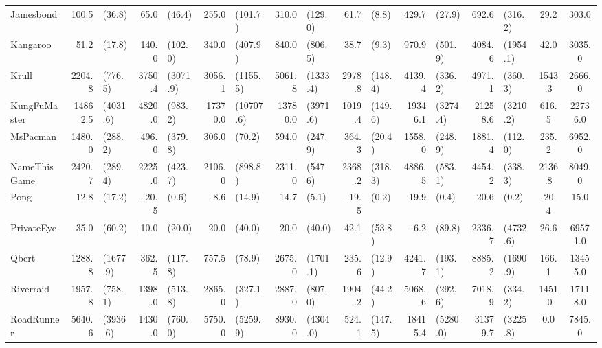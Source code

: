 \begin{landscape}
\begin{changemargin}{0cm}{0cm}
\begin{center}
\begin{table}[!htbp]
\begin{tabular}{l|rl|rl|rl|rl|rl|rl|rl|c|c}
Jamesbond      &    100.5 &     (36.8) &     65.0 &    (46.4) &      255.0 &      (101.7) &    310.0 &    (129.0) &     61.7 &    (8.8) &    429.7 &     (27.9) &     692.6 &    (316.2) &     29.2 &    303.0 \\
Kangaroo       &     51.2 &     (17.8) &    140.0 &   (102.0) &      340.0 &      (407.9) &    840.0 &    (806.5) &     38.7 &    (9.3) &    970.9 &    (501.9) &    4084.6 &   (1954.1) &     42.0 &   3035.0 \\
Krull          &   2204.8 &    (776.5) &   3750.4 &  (3071.9) &     3056.1 &     (1155.5) &   5061.8 &   (1333.4) &   2978.8 &  (148.4) &   4139.4 &    (336.2) &    4971.1 &    (360.3) &   1543.3 &   2666.0 \\
KungFuMaster   &  14862.5 &   (4031.6) &   4820.0 &   (983.2) &    17370.0 &    (10707.6) &  13780.0 &   (3971.6) &   1019.4 &  (149.6) &  19346.1 &   (3274.4) &   21258.6 &   (3210.2) &    616.5 &  22736.0 \\
MsPacman       &   1480.0 &    (288.2) &    496.0 &   (379.8) &      306.0 &       (70.2) &    594.0 &    (247.9) &    364.3 &   (20.4) &   1558.0 &    (248.9) &    1881.4 &    (112.0) &    235.2 &   6952.0 \\
NameThisGame   &   2420.7 &    (289.4) &   2225.0 &   (423.7) &     2106.0 &      (898.8) &   2311.0 &    (547.6) &   2368.2 &  (318.3) &   4886.5 &    (583.1) &    4454.2 &    (338.3) &   2136.8 &   8049.0 \\
Pong           &     12.8 &     (17.2) &    -20.5 &     (0.6) &       -8.6 &       (14.9) &     14.7 &      (5.1) &    -19.5 &    (0.2) &     19.9 &      (0.4) &      20.6 &      (0.2) &    -20.4 &     15.0 \\
PrivateEye     &     35.0 &     (60.2) &     10.0 &    (20.0) &       20.0 &       (40.0) &     20.0 &     (40.0) &     42.1 &   (53.8) &     -6.2 &     (89.8) &    2336.7 &   (4732.6) &     26.6 &  69571.0 \\
Qbert          &   1288.8 &   (1677.9) &    362.5 &   (117.8) &      757.5 &       (78.9) &   2675.0 &   (1701.1) &    235.6 &   (12.9) &   4241.7 &    (193.1) &    8885.2 &   (1690.9) &    166.1 &  13455.0 \\
Riverraid      &   1957.8 &    (758.1) &   1398.0 &   (513.8) &     2865.0 &      (327.1) &   2887.0 &    (807.0) &   1904.2 &   (44.2) &   5068.6 &    (292.6) &    7018.9 &    (334.2) &   1451.0 &  17118.0 \\
RoadRunner     &   5640.6 &   (3936.6) &   1430.0 &   (760.0) &     5750.0 &     (5259.9) &   8930.0 &   (4304.0) &    524.1 &  (147.5) &  18415.4 &   (5280.0) &   31379.7 &   (3225.8) &      0.0 &   7845.0 \\

\end{tabular}
\end{table}
\end{center}
\end{changemargin}
\end{landscape}
